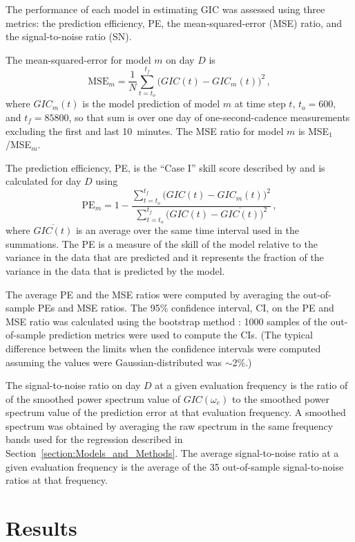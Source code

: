 \documentclass[draft,linenumbers]{agujournal2018}
\begin{document}
The performance of each model in estimating GIC was assessed using three metrics: the prediction efficiency, PE, the mean-squared-error (MSE) ratio, and the signal-to-noise ratio (SN). 

The mean-squared-error for model $m$ on day $D$ is
\begin{equation*}
\mbox{MSE}_m = \frac{1}{N}\sum_{t=t_o}^{t_f} \big(GIC(t)-GIC_m(t)\big)^2 \,,
\end{equation*}
\noindent
where $GIC_m(t)$ is the model prediction of model $m$ at time step $t$, $t_o=600$, and $t_f=85800$, so that sum is over one day of one-second-cadence measurements excluding the first and last 10~minutes. The MSE ratio for model $m$ is MSE$_1$/MSE$_m$.

The prediction efficiency, PE, is the ``Case I'' skill score described by \cite{Murphy1988} and is calculated for day $D$ using 
\begin{equation*}
\mbox{PE}_m = 1 - \frac{\sum_{t=t_o}^{t_f} \big(GIC(t)-GIC_m(t)\big)^2}{\sum_{t=t_o}^{t_f} \big(GIC(t)-\overline{GIC(t)}\big)^2}\,,
\end{equation*}
\noindent
where $\overline{GIC(t)}$ is an average over the same time interval used in the summations. The PE is a measure of the skill of the model relative to the variance in the data that are predicted and it represents the fraction of the variance in the data that is predicted by the model.

The average PE and the MSE ratios were computed by averaging the out-of-sample PEs and MSE ratios. The 95\% confidence interval, CI, on the PE and MSE ratio was calculated using the bootstrap method \citep{Zoubir1998}: 1000 samples of the out-of-sample prediction metrics were used to compute the CIs. (The typical difference between the limits when the confidence intervals were computed assuming the values were Gaussian-distributed was $\sim$2\%.) 

The signal-to-noise ratio on day $D$ at a given evaluation frequency is the ratio of of the smoothed power spectrum value of $GIC(\omega_e)$ to the smoothed power spectrum value of the prediction error at that evaluation frequency. A smoothed spectrum was obtained by averaging the raw spectrum in the same frequency bands used for the regression described in Section~\ref{section:Models_and_Methods}. The average signal-to-noise ratio at a given evaluation frequency is the average of the 35 out-of-sample signal-to-noise ratios at that frequency.

\section{Results}
\end{document}
